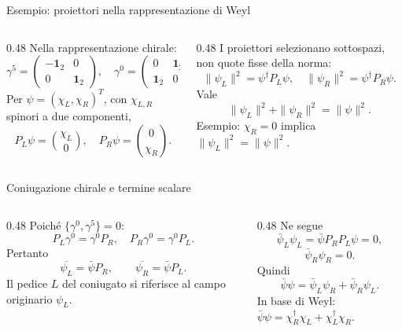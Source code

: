 \begin{frame}{Esempio: proiettori nella rappresentazione di Weyl}
\small
\begin{columns}[T,onlytextwidth]
\begin{column}{0.48\textwidth}
Nella rappresentazione chirale:
\[
 \gamma^5=\begin{pmatrix}-\mathbf1_2&0\\0&\mathbf1_2\end{pmatrix},
 \quad
 \gamma^0=\begin{pmatrix}0&\mathbf1_2\\\mathbf1_2&0\end{pmatrix}.
\]
Per $\psi=(\chi_L,\chi_R)^T$, con $\chi_{L,R}$ spinori a due componenti,
\[
 P_L\psi=\binom{\chi_L}{0},\quad
 P_R\psi=\binom{0}{\chi_R}.
\]
\end{column}
\begin{column}{0.48\textwidth}
I proiettori selezionano sottospazi, non quote fisse della norma:
\[
 \|\psi_L\|^2=\psi^\dagger P_L\psi,
 \quad \|\psi_R\|^2=\psi^\dagger P_R\psi.
\]
Vale
\[
 \|\psi_L\|^2+\|\psi_R\|^2=\|\psi\|^2.
\]
Esempio: $\chi_R=0$ implica $\|\psi_L\|^2=\|\psi\|^2$.
\end{column}
\end{columns}
\end{frame}

\begin{frame}{Coniugazione chirale e termine scalare}
\small
\begin{columns}[T,onlytextwidth]
\begin{column}{0.48\textwidth}
Poiché $\{\gamma^0,\gamma^5\}=0$:
\[
 P_L\gamma^0=\gamma^0P_R,\quad
 P_R\gamma^0=\gamma^0P_L.
\]
Pertanto
\[
 \overline{\psi_L}=\bar\psi P_R,\qquad
 \overline{\psi_R}=\bar\psi P_L.
\]
Il pedice $L$ del coniugato si riferisce al campo originario $\psi_L$.
\end{column}
\begin{column}{0.48\textwidth}
Ne segue
\[
 \bar\psi_L\psi_L=\bar\psi P_RP_L\psi=0,
\]
\[
 \bar\psi_R\psi_R=0.
\]
Quindi
\[
 \bar\psi\psi=\bar\psi_L\psi_R+
 \bar\psi_R\psi_L.
\]
In base di Weyl:
$\bar\psi\psi=\chi_R^\dagger\chi_L+\chi_L^\dagger\chi_R$.
\end{column}
\end{columns}
\end{frame}

